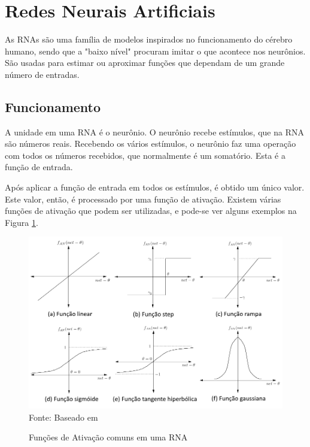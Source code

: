 \documentclass[
	12pt,					%
	openright,				%
	oneside,				%
	a4paper,				%
	bibjustif,				%
	chapter=TITLE,			%
	english,				%
	brazil,					%
	]{abntex2}
\newcommand{\source}[1]{\small Fonte: {#1}}
\begin{document}
	\FloatBarrier
	\section{Redes Neurais Artificiais}
	As RNAs são uma família de modelos inspirados no funcionamento do cérebro humano,
	sendo que a "baixo nível"{} procuram imitar o que acontece nos neurônios.
	São usadas para estimar ou aproximar funções que dependam de um grande número de entradas.
	
	\subsection{Funcionamento}
	A unidade em uma RNA é o neurônio.
	O neurônio recebe estímulos, que na RNA são números reais.
	Recebendo os vários estímulos, o neurônio faz uma operação com todos os números recebidos,
	que normalmente é um somatório.
	Esta é a função de entrada.
	
	Após aplicar a função de entrada em todos os estímulos,
	é obtido um único valor.
	Este valor, então, é processado por uma função de ativação.
	Existem várias funções de ativação que podem ser utilizadas,
	e pode-se ver alguns exemplos na Figura \ref{fig:activationFunctions}.
	
	\begin{figure}[ht!]
		\caption{Funções de Ativação comuns em uma RNA}
		\centering
		\includegraphics[scale=0.48]{img/ActivationFunctions.png}\\
		\vspace{0.5mm}
		\source{Baseado em }
		\label{fig:activationFunctions}
	\end{figure}
	
\end{document}
